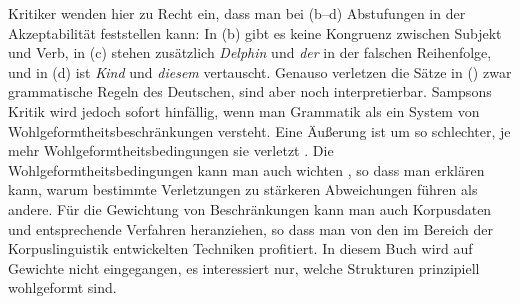 \eal
{}
\zl
Kritiker wenden hier zu Recht ein, dass man bei (b--d) Abstufungen in der Akzeptabilität
feststellen kann: In (b) gibt es keine Kongruenz zwischen Subjekt und Verb, in (c)
stehen zusätzlich \emph{Delphin} und \emph{der} in der falschen Reihenfolge, und in (d) ist \emph{Kind}
und \emph{diesem} vertauscht. Genauso verletzen die Sätze in () zwar grammatische
Regeln des Deutschen, sind aber noch interpretierbar.
Sampsons Kritik wird jedoch sofort hinfällig, wenn man Grammatik als ein System
von Wohlgeformtheitsbeschränkungen versteht. Eine Äußerung ist um so schlechter,
je mehr Wohlgeformtheitsbedingungen sie verletzt \citep[--27]{PS2001a}. Die
Wohlgeformtheitsbedingungen kann man auch wichten %
\citep[z.\,B.][]{Sensekerci2024a-u}, 
so dass man erklären kann, warum bestimmte Verletzungen zu stärkeren Abweichungen führen als andere.
Für die Gewichtung von Beschränkungen kann man auch Korpusdaten und entsprechende Verfahren
heranziehen, so dass man von den im Bereich der Korpuslinguistik entwickelten Techniken profitiert.
In diesem Buch wird auf Gewichte nicht eingegangen, es interessiert nur, welche Strukturen prinzipiell wohlgeformt sind.








